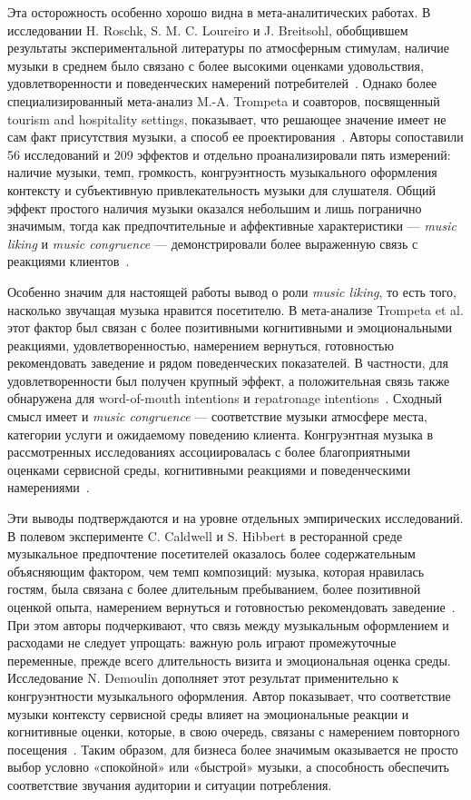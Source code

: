 Эта осторожность особенно хорошо видна в мета-аналитических работах. В исследовании H. Roschk, S. M. C. Loureiro и J. Breitsohl, обобщившем результаты экспериментальной литературы по атмосферным стимулам, наличие музыки в среднем было связано с более высокими оценками удовольствия, удовлетворенности и поведенческих намерений потребителей~\cite{roschk2017atmospheric}. Однако более специализированный мета-анализ M.-A. Trompeta и соавторов, посвященный tourism and hospitality settings, показывает, что решающее значение имеет не сам факт присутствия музыки, а способ ее проектирования~\cite{trompeta2022music}. Авторы сопоставили 56 исследований и 209 эффектов и отдельно проанализировали пять измерений: наличие музыки, темп, громкость, конгруэнтность музыкального оформления контексту и субъективную привлекательность музыки для слушателя. Общий эффект простого наличия музыки оказался небольшим и лишь погранично значимым, тогда как предпочтительные и аффективные характеристики — \textit{music liking} и \textit{music congruence} — демонстрировали более выраженную связь с реакциями клиентов~\cite{trompeta2022music}.

Особенно значим для настоящей работы вывод о роли \textit{music liking}, то есть того, насколько звучащая музыка нравится посетителю. В мета-анализе Trompeta et al. этот фактор был связан с более позитивными когнитивными и эмоциональными реакциями, удовлетворенностью, намерением вернуться, готовностью рекомендовать заведение и рядом поведенческих показателей. В частности, для удовлетворенности был получен крупный эффект, а положительная связь также обнаружена для word-of-mouth intentions и repatronage intentions~\cite{trompeta2022music}. Сходный смысл имеет и \textit{music congruence} — соответствие музыки атмосфере места, категории услуги и ожидаемому поведению клиента. Конгруэнтная музыка в рассмотренных исследованиях ассоциировалась с более благоприятными оценками сервисной среды, когнитивными реакциями и поведенческими намерениями~\cite{trompeta2022music}.

Эти выводы подтверждаются и на уровне отдельных эмпирических исследований. В полевом эксперименте C. Caldwell и S. Hibbert в ресторанной среде музыкальное предпочтение посетителей оказалось более содержательным объясняющим фактором, чем темп композиций: музыка, которая нравилась гостям, была связана с более длительным пребыванием, более позитивной оценкой опыта, намерением вернуться и готовностью рекомендовать заведение~\cite{caldwell2002tempo}. При этом авторы подчеркивают, что связь между музыкальным оформлением и расходами не следует упрощать: важную роль играют промежуточные переменные, прежде всего длительность визита и эмоциональная оценка среды. Исследование N. Demoulin дополняет этот результат применительно к конгруэнтности музыкального оформления. Автор показывает, что соответствие музыки контексту сервисной среды влияет на эмоциональные реакции и когнитивные оценки, которые, в свою очередь, связаны с намерением повторного посещения~\cite{demoulin2011music}. Таким образом, для бизнеса более значимым оказывается не просто выбор условно «спокойной» или «быстрой» музыки, а способность обеспечить соответствие звучания аудитории и ситуации потребления.

